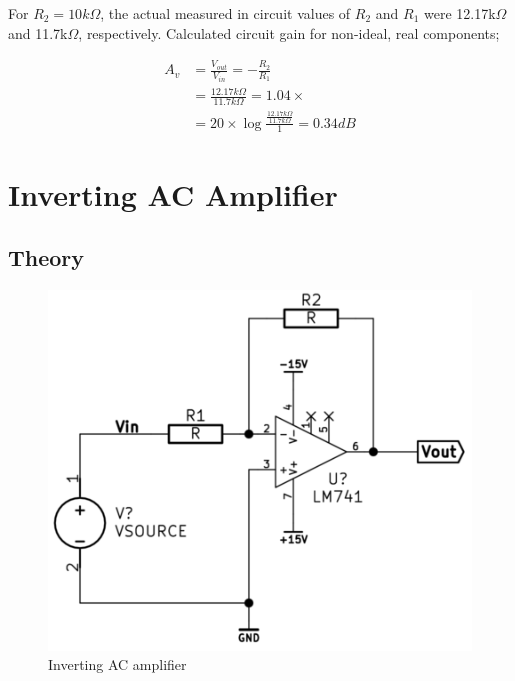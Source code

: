 \documentclass[11pt,a4paper]{article}
\begin{document}
For $R_2 = 10k\Omega$, the actual measured in circuit values of $R_2$ and $R_1$
were 12.17k$\Omega$ and 11.7k$\Omega$, respectively. Calculated circuit gain
for non-ideal, real components;

\begin{align} 
A_v     &= \frac{V_{out}}{V_{in}} = -\frac{R_2}{R_1}\\
        &= \frac{12.17k\Omega}{11.7k\Omega} = 1.04\times\\
        &= 20 \times \log{\frac{\frac{12.17k\Omega}{11.7k\Omega}}{1}} = 0.34dB  
\end{align}

\section{Inverting AC Amplifier}\label{inverting-ac-amplifier}

\subsection{Theory}\label{invAC-theory}

\begin{figure}[htbp]
    \centering
    \includegraphics[scale=0.5]{img/invACamp.png}
    \caption{Inverting AC amplifier}
    \label{fig:invACamp}
\end{figure}
\end{document}
